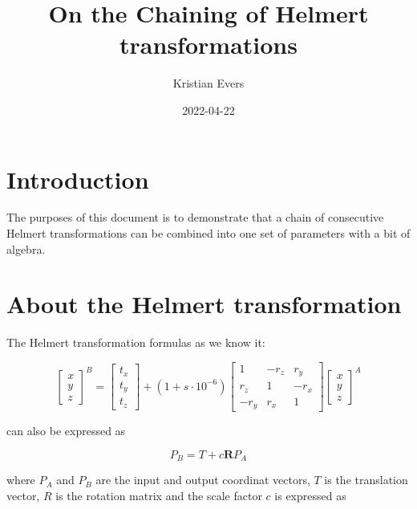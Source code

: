 \documentclass[11pt,twocolumn]{article}
\title{On the Chaining of Helmert transformations}
\author{Kristian Evers}
\date{2022-04-22}
\newcommand{\matr}[1]{\mathbf{#1}}
\begin{document}
\maketitle

\section{Introduction}

The purposes of this document is to demonstrate that a chain of consecutive
Helmert transformations can be combined into one set of parameters with a bit of
algebra.

\section{About the Helmert transformation}

The Helmert transformation formulas as we know it:

\begin{equation}
    \begin{bmatrix}
        x
        \\ 
        y
        \\ 
        z
    \end{bmatrix}^B
%
    =
%
    \begin{bmatrix}
        t_x \\ t_y \\ t_z
    \end{bmatrix}
%
    + (1+s\cdot10^{-6})
%
    \begin{bmatrix}
        1       & -r_{z}  &  r_{y}   \\ 
        r_{z}   &  1      & -r_{x} \\ 
        -r_{y}   &  r_{x}  &  1
    \end{bmatrix}
%
    \begin{bmatrix}
        x \\ y \\ z
    \end{bmatrix}^A
\end{equation}

can also be expressed as

\begin{equation}
    \label{eq:simplehelmert}
    P_{B} = T + c\matr{R}P_{A}
\end{equation}

where $P_{A}$ and $P_{B}$ are the input and output coordinat vectors,
$T$ is the translation vector, $R$ is the rotation matrix and the scale
factor $c$ is expressed as
\end{document}
